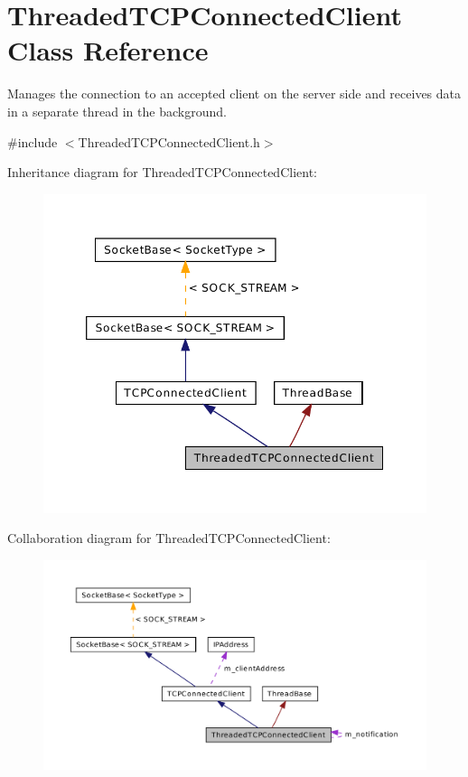 \hypertarget{class_threaded_t_c_p_connected_client}{\section{Threaded\-T\-C\-P\-Connected\-Client Class Reference}
\label{class_threaded_t_c_p_connected_client}
}


Manages the connection to an accepted client on the server side and receives data in a separate thread in the background.  




{\ttfamily \#include $<$Threaded\-T\-C\-P\-Connected\-Client.\-h$>$}



Inheritance diagram for Threaded\-T\-C\-P\-Connected\-Client\-:\nopagebreak
\begin{figure}[H]
\begin{center}
\leavevmode
\includegraphics[width=350pt]{class_threaded_t_c_p_connected_client__inherit__graph}
\end{center}
\end{figure}


Collaboration diagram for Threaded\-T\-C\-P\-Connected\-Client\-:\nopagebreak
\begin{figure}[H]
\begin{center}
\leavevmode
\includegraphics[width=350pt]{class_threaded_t_c_p_connected_client__coll__graph}
\end{center}
\end{figure}
